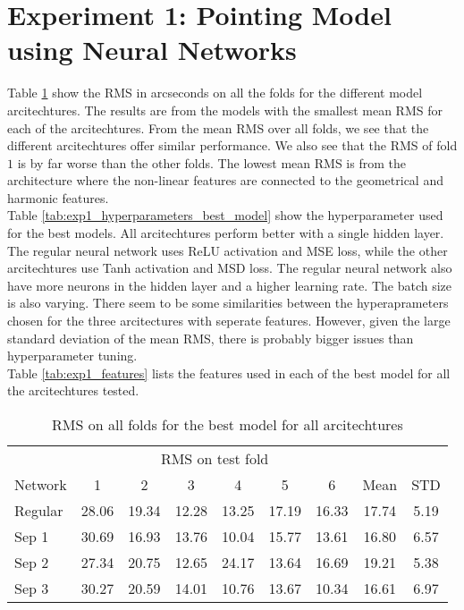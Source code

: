 
\section{Experiment 1: Pointing Model using Neural Networks}

Table \ref{tab:exp1_rms_folds_best_model} show the RMS in arcseconds on all the folds for the different model arcitechtures.
The results are from the models with the smallest mean RMS for each of the arcitechtures.
From the mean RMS over all folds, we see that the different arcitechtures offer similar performance.
We also see that the RMS of fold $1$ is by far worse than the other folds.
The lowest mean RMS is from the architecture where the non-linear features are connected to the geometrical and harmonic features.\\

Table \ref{tab:exp1_hyperparameters_best_model} show the hyperparameter used for the best models.
All arcitechtures perform better with a single hidden layer.
The regular neural network uses ReLU activation and MSE loss, while the other arcitechtures use Tanh activation and MSD loss.
The regular neural network also have more neurons in the hidden layer and a higher learning rate.
The batch size is also varying. There seem to be some similarities between the hyperaprameters chosen for the three arcitectures with seperate features.
However, given the large standard deviation of the mean RMS, there is probably bigger issues than hyperparameter tuning.\\

Table \ref{tab:exp1_features} lists the features used in each of the best model for all the arcitechtures tested.

\begin{table}[!htbp]
    \centering
    \label{tab:exp1_rms_folds_best_model}
    \caption{RMS on all folds for the best model for all arcitechtures}
    \begin{tabular}{lcccccccc}
        \toprule
        & \multicolumn{6}{c}{RMS on test fold} & & \\
        \cmidrule(lr){2-7}
        Network & 1 & 2 & 3 & 4 & 5 & 6 & Mean & STD\\
        \midrule
        Regular & 28.06 & 19.34 & 12.28 & 13.25 & 17.19 & 16.33 & 17.74 & 5.19 \\
        Sep 1 & 30.69 & 16.93 & 13.76 & 10.04 & 15.77 & 13.61 & 16.80 & 6.57 \\
        Sep 2 & 27.34 & 20.75 & 12.65 & 24.17 & 13.64 & 16.69 & 19.21 & 5.38 \\
        Sep 3 & 30.27 & 20.59 & 14.01 & 10.76 & 13.67 & 10.34 & 16.61 & 6.97 \\
        \bottomrule
    \end{tabular}
\end{table}

